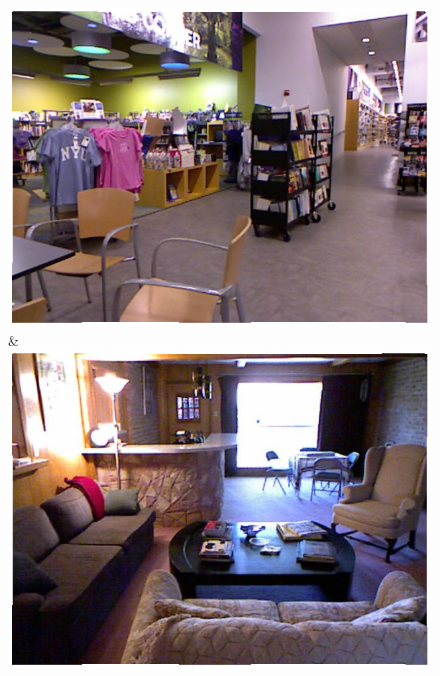 \documentclass[a4paper, 10pt, conference]{ieeeconf}      %
\begin{document}
\begin{figure}
\begin{tabu}
    \includegraphics[width=\linewidth]{images/00118_image.png}&%
    \includegraphics[width=\linewidth]{images/01203_image.png}\\
    \vspace{3mm}\\



\end{tabu}
\end{figure}
\end{document}
